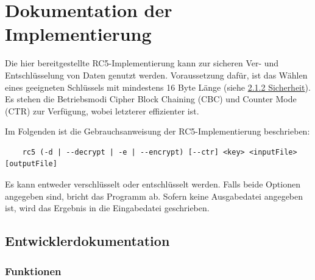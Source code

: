 \documentclass[course=erap]{aspdoc}
\begin{document}
\section{Dokumentation der Implementierung}
Die hier bereitgestellte RC5-Implementierung kann zur sicheren Ver- und Entschlüsselung von Daten
genutzt werden.
Voraussetzung dafür, ist das Wählen eines geeigneten Schlüssels mit mindestens 16 Byte Länge (siehe
\hyperref[sec:Sicherheit]{2.1.2 Sicherheit}).
Es stehen die Betriebsmodi Cipher Block Chaining (CBC) und Counter Mode (CTR) zur Verfügung, wobei
letzterer effizienter ist.\bigbreak

Im Folgenden ist die Gebrauchsanweisung der RC5-Implementierung beschrieben:

\begin{verbatim}
    rc5 (-d | --decrypt | -e | --encrypt) [--ctr] <key> <inputFile> [outputFile]
\end{verbatim}
Es kann entweder verschlüsselt oder entschlüsselt werden.
Falls beide Optionen angegeben sind, bricht das Programm ab.
Sofern keine Ausgabedatei angegeben ist, wird das Ergebnis in die Eingabedatei geschrieben.

\subsection{Entwicklerdokumentation}

\subsubsection{Funktionen}
\end{document}
